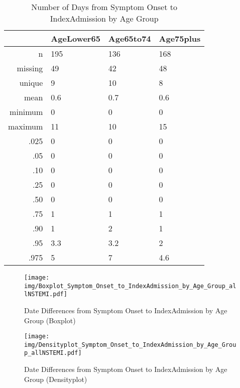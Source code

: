 \documentclass[a4paper]{report}
\begin{document}
\begin{itemize}
{%
\begin{table}[ht]
\centering
\begin{tabular}{rlll}
  \toprule
 & AgeLower65 & Age65to74 & Age75plus \\ 
  \midrule
n & 195 & 136 & 168 \\ 
  missing & 49 & 42 & 48 \\ 
  unique & 9 & 10 & 8 \\ 
  mean & 0.6 & 0.7 & 0.6 \\ 
  minimum & 0 & 0 & 0 \\ 
  maximum & 11 & 10 & 15 \\ 
  .025 & 0 & 0 & 0 \\ 
  .05 & 0 & 0 & 0 \\ 
  .10 & 0 & 0 & 0 \\ 
  .25 & 0 & 0 & 0 \\ 
  .50 & 0 & 0 & 0 \\ 
  .75 & 1 & 1 & 1 \\ 
  .90 & 1 & 2 & 1 \\ 
  .95 & 3.3 & 3.2 & 2 \\ 
  .975 & 5 & 7 & 4.6 \\ 
   \bottomrule
\end{tabular}
\caption{Number of Days from Symptom Onset to IndexAdmission by Age Group} 
\end{table}
\begin{figure}
  \centering
  \caption{Date Differences from Symptom Onset to IndexAdmission by Age Group (Boxplot)}
  \label{Boxplot: Date Differences from Symptom Onset to IndexAdmission by Age Group}
\texttt{[image: img/Boxplot\_Symptom\_Onset\_to\_IndexAdmission\_by\_Age\_Group\_allNSTEMI.pdf]}\end{figure}


\begin{figure}
  \centering
  \caption{Date Differences from Symptom Onset to IndexAdmission by Age Group (Densityplot)}
  \label{Density: Date Differences from Symptom Onset to IndexAdmission by Age Group}
\texttt{[image: img/Densityplot\_Symptom\_Onset\_to\_IndexAdmission\_by\_Age\_Group\_allNSTEMI.pdf]}\end{figure}



\clearpage

}
\end{itemize}
\end{document}
